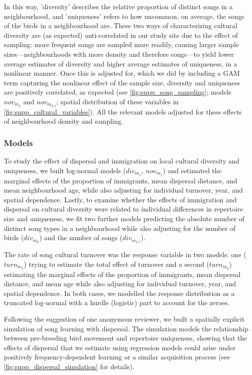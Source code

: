 \documentclass[9pt, onecolumn, twoside, lineno]{gsajnl}
\begin{document}
In this way, 'diversity' describes the relative proportion of distinct songs in a neighbourhood, and 'uniqueness' refers to how uncommon, on average, the songs of the birds in a neighbourhood are. These two ways of characterizing cultural diversity are (as expected) anti-correlated in our study site due to the effect of sampling: more frequent songs are sampled more readily, causing larger sample sizes---neighbourhoods with more density and therefore songs---to yield lower average estimates of diversity and higher average estimates of uniqueness, in a nonlinear manner. Once this is adjusted for, which we did by including  a GAM term capturing the nonlinear effect of the sample size, diversity and uniqueness are positively correlated, as expected (see \autoref{fig:supp_song_sampling}; models $nov_{m_2}$ and $nov_{m_{2.1}}$; spatial distribution of these variables in \autoref{fig:supp_cultural_variables}). All the relevant models adjusted for these effects of neighbourhood density and sampling.

\subsubsection{Models}

To study the effect of dispersal and immigration on local cultural diversity and uniqueness, we built log-normal models ($div_{m_1}$, $nov_{m_1}$) and estimated the marginal effects of the proportion of immigrants, mean dispersal distance, and mean neighbourhood age, while also adjusting for individual turnover, year, and spatial dependence. Lastly, to examine whether the effects of immigration and dispersal on cultural diversity were related to individual differences in repertoire size and uniqueness, we fit two further models predicting the absolute number of distinct song types in a neighbourhood while also adjusting for the number of birds ($div_{m_2}$) and the number of songs ($div_{m_{2.1}}$).

The rate of song cultural turnover was the response variable in two models: one ($turn_{m_1}$) trying to estimate the total effect of turnover and a second ($turn_{m_2}$) estimating the marginal effects of the proportion of immigrants, mean dispersal distance, and mean age while also adjusting for individual turnover, year, and spatial dependence. In both cases, we modelled the response distribution as a truncated log-normal with a hurdle (logistic) part to account for the zeroes.

Following the suggestion of one anonymous reviewer, we built a spatially explicit simulation of song learning with dispersal. The simulation models the relationship between pre-breeding bird movement and repertoire uniqueness, showing that the effects of dispersal that we estimate using regression models could arise under positively frequency-dependent learning or a similar acquisition process (see \autoref{fig:supp_dispersal_simulation} for details).
\end{document}

